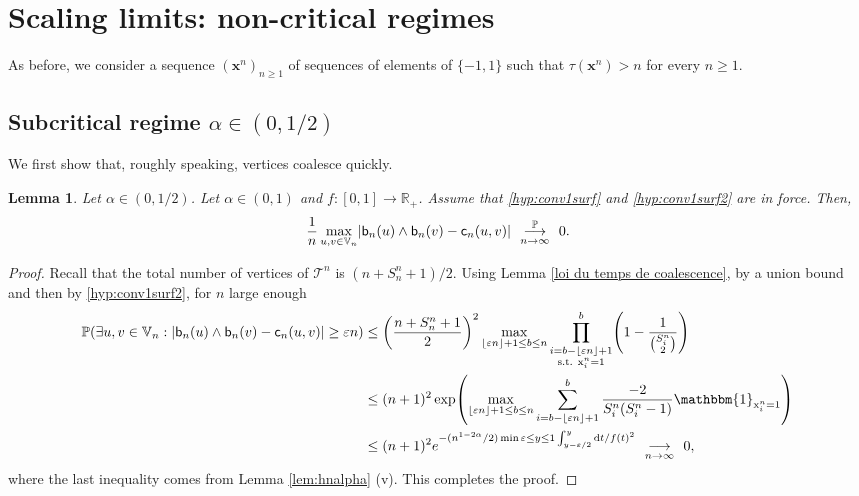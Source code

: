 \documentclass[11pt]{article}
\theoremstyle{plain}
\newtheorem{lemma}[theorem]{Lemma}
\theoremstyle{definition}
\theoremstyle{remark}
\newcommand{\R}{\mathbb{R}} %
\renewcommand{\P}{{\mathbb{P}}} %
\newcommand{\1}{\mathbbm{1}} %
\newcommand{\proba}[1]{\mathbb{P}\left(#1\right)} %
\newcommand{\e}{\varepsilon} %
\newcommand{\birth}{\mathsf{b}} %
\newcommand{\coal}{\mathsf{c}} %
\newcommand{\Xb}{\mathrm{\mathbf{x}}} %
\newcommand{\X}{\mathrm x} %
\newcommand{\V}{\mathbb{V}} %
\newcommand{\cv}[1][n]{\enskip\mathop{\longrightarrow}^{}_{#1 \to \infty}\enskip}
\newcommand{\cvproba}[1][n]{\enskip\mathop{\longrightarrow}^{\P}_{#1 \to \infty}\enskip}
\let\originalleft\left
\let\originalright\right
\renewcommand{\left}{\mathopen{}\mathclose\bgroup\originalleft}
\renewcommand{\right}{\aftergroup\egroup\originalright}
\begin{document}
\section{Scaling limits: non-critical regimes}
\label{sec:noncritical}

As before, we consider a sequence $(\Xb^n)_{n \geq 1}$ of sequences of elements of $\{-1,1\}$ such that $\tau(\Xb^n)>n$ for every $n \geq 1$.



\subsection{Subcritical  regime \texorpdfstring{$\alpha \in (0,1/2)$}{}}


We first show that, roughly speaking, vertices coalesce quickly.


\begin{lemma}\label{lemme ça coalesce vite}
Let $\alpha \in (0,1/2)$. Let $\alpha \in (0,1)$ and $f:[0,1] \rightarrow \R_+$. Assume that \ref{hyp:conv1surf} and \ref{hyp:conv1surf2} are in force. Then, 
\[
\frac{1}{n}\max_{u,v \in \V_{n}}\left| \birth_{n}(u) \wedge \birth_n(v)-\coal_{n}(u,v)\right| \cvproba[n] 0.
\]
\end{lemma}
\begin{proof}
{Recall that the total number of vertices of $ \mathcal{T}^{n}$ is $(n+S_n^n+1)/2$.} {Using Lemma \ref{loi du temps de coalescence}}, by a union bound and then by \ref{hyp:conv1surf2}, for $n$ large enough
\begin{align*}
\P\left( \exists u, v \in \V_{n}: \left| \birth_n(u) \wedge \birth_{n}(v)-\coal_n(u,v)\right| \ge \e n\right) &\le \left(\frac{n+S_n^n+1}{2}\right)^2
\max_{\lfloor\e n \rfloor+1\le b \le n}\prod_{\substack{i=b-\lfloor \e n \rfloor+1 \\ \text{s.t. } \X^n_i=1}}^b \left( 1-\frac{1}{\binom{S_i^n}{2}}\right) \\
&\le(n+1)^2 \exp\left(\max_{\lfloor \e n \rfloor +1 \le b \le n} \sum_{i=b-\lfloor \e n \rfloor+1}^b \frac{-2}{S^n_i(S^n_{i}-1)}\1_{\X^n_i=1} \right) \\
&\le (n+1)^2
e^{-(n^{1-2\alpha}/2)\min{\e \le y \le 1} \int_{y-\e/2}^y {\mathrm{d} t}/{f(t)^2} }
\cv[n] 0,
\end{align*}
where the last inequality comes from Lemma \ref{lem:hnalpha} (v).
This completes the proof.
\end{proof}
\end{document}
